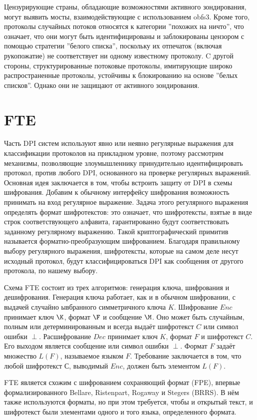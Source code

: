 Цензурирующие страны, обладающие возможностями активного зондирования, могут выявить мосты, взаимодействующие с использованием obfs3.
Кроме того, протоколы случайных потоков относятся к категории ''похожих на ничто'', что означает,
что они могут быть идентифицированы и заблокированы цензором с помощью стратегии ''белого списка'',
поскольку их отпечаток (включая рукопожатие) не соответствует ни одному известному протоколу.
C другой стороны, структурированные потоковые протоколы, имитирующие широко распространенные протоколы,
устойчивы к блокированию на основе ''белых списков''. Однако они не защищают от активного зондирования.

\section{FTE}

Часть DPI систем используют явно или неявно регулярные выражения для классификации протоколов на прикладном уровне,
поэтому рассмотрим механизмы, позволяющие злоумышленнику принудительно идентифицировать протокол, против любого DPI, основанного на проверке регулярных выражений.
Основная идея заключается в том, чтобы встроить защиту от DPI в схемы шифрования.
Добавим к обычному интерфейсу шифрования возможность принимать на вход регулярное выражение.
Задача этого регулярного выражения определять формат шифротекстов: это означает,
что шифротексты, взятые в виде строк соответствующего алфавита, гарантированно будут соответствовать заданному регулярному выражению.
Такой криптографический примитив называется форматно-преобразующим шифрованием.
Благодаря правильному выбору регулярного выражения, шифротексты, которые на самом деле несут исходный протокол,
будут классифицироваться DPI как сообщения от другого протокола, по нашему выбору.

Схема FTE состоит из трех алгоритмов: генерация ключа, шифрования и дешифрования.
Генерация ключа работает, как и в обычном шифровании, с выдачей случайно ывбранного симметричного ключа $K$.
Шифрование $Enc$ принимает ключ $\K$, формат $\F$ и сообщение $\M$.
Оно может быть случайным, полным или детерминированным и всегда выдаёт шифротекст $C$ или символ ошибки $\perp$.
Расшифрование $Dec$ принимает ключ $K$, формат $F$ и шифротекст $C$. Его выходом является сообщение или символ ошибки $\perp$.
Формат $F$ задаёт множество $L(F)$, называемое языком $F$.
Требование заключается в том, что любой шифротекст $С$, выводимый $Enc$, должен быть элементом $L(F)$.

FTE является схожим с шифрованием сохраняющий формат (FPE), впервые формализированного Bellare, Ristenpart, Rogaway и Stegers (BRRS).
В нём также используются форматы, но при этом требуется, чтобы и открытый текст, и шифротекст были элементами одного и того языка, определенного формата.

